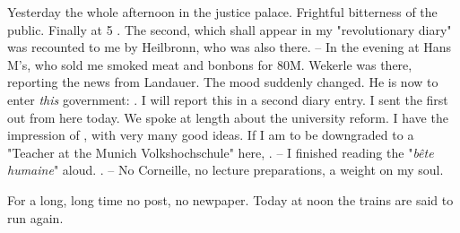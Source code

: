 
Yesterday the whole afternoon in the justice palace. Frightful  bitterness of the public. Finally at 5 . The second, which shall appear in my "revolutionary diary" was recounted to me by Heilbronn, who was also there. -- In the evening at Hans M's, who sold me smoked meat and bonbons for 80M. Wekerle was there, reporting the news from Landauer. The mood suddenly changed. He is now to enter \textit{this} government: . I will report this in a second diary entry. I sent the first out from here today. We spoke at length about the university reform. I have the impression of , with very many good ideas. If I am to be downgraded to a "Teacher at the Munich Volkshochschule" here, . -- I finished reading the "\textit{bête humaine}" aloud. . -- No Corneille, no lecture preparations, a weight on my soul.

For a long, long time no post, no newpaper. Today at noon the trains are said to run again.

